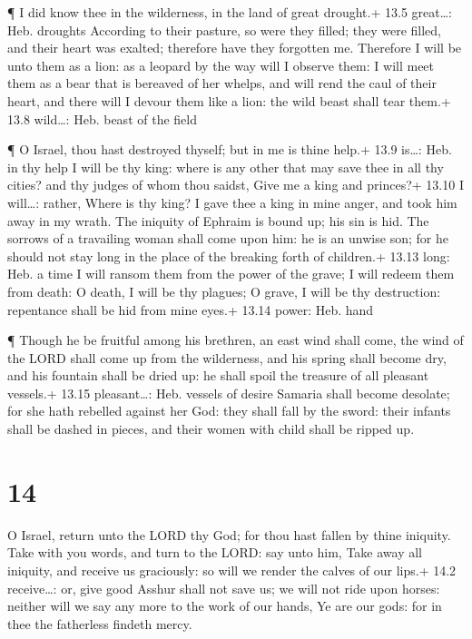  ¶ I did know thee in the wilderness, in the land of great
drought.+ 13.5 great\ldots: Heb. droughts  According to
their pasture, so were they filled; they were filled, and their heart
was exalted; therefore have they forgotten me.  Therefore I
will be unto them as a lion: as a leopard by the way will I observe
them:  I will meet them as a bear that is bereaved of her
whelps, and will rend the caul of their heart, and there will I devour
them like a lion: the wild beast shall tear them.+ 13.8 wild\ldots: Heb.
beast of the field

 ¶ O Israel, thou hast destroyed thyself; but in me is thine
help.+ 13.9 is\ldots: Heb. in thy help  I will be thy king:
where is any other that may save thee in all thy cities? and thy judges
of whom thou saidst, Give me a king and princes?+ 13.10 I will\ldots:
rather, Where is thy king?  I gave thee a king in mine
anger, and took him away in my wrath.  The iniquity of
Ephraim is bound up; his sin is hid.  The sorrows of a
travailing woman shall come upon him: he is an unwise son; for he should
not stay long in the place of the breaking forth of children.+ 13.13
long: Heb. a time  I will ransom them from the power of the
grave; I will redeem them from death: O death, I will be thy plagues; O
grave, I will be thy destruction: repentance shall be hid from mine
eyes.+ 13.14 power: Heb. hand

 ¶ Though he be fruitful among his brethren, an east wind
shall come, the wind of the LORD shall come up from the wilderness, and
his spring shall become dry, and his fountain shall be dried up: he
shall spoil the treasure of all pleasant vessels.+ 13.15 pleasant\ldots:
Heb. vessels of desire  Samaria shall become desolate; for
she hath rebelled against her God: they shall fall by the sword: their
infants shall be dashed in pieces, and their women with child shall be
ripped up.

\hypertarget{section-13}{%
\section{14}\label{section-13}}

 O Israel, return unto the LORD thy God; for thou hast
fallen by thine iniquity.  Take with you words, and turn to
the LORD: say unto him, Take away all iniquity, and receive us
graciously: so will we render the calves of our lips.+ 14.2
receive\ldots: or, give good  Asshur shall not save us; we
will not ride upon horses: neither will we say any more to the work of
our hands, Ye are our gods: for in thee the fatherless findeth mercy.

